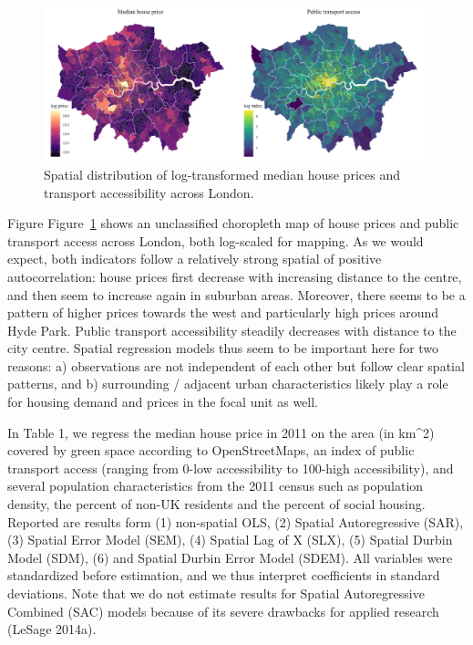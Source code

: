 \documentclass[
  letterpaper,
]{scrbook}
\begin{document}
\begin{figure}

{\centering \includegraphics{fig/Maps.jpeg}

}

\caption{\label{fig-map}Spatial distribution of log-transformed median
house prices and transport accessibility across London.}

\end{figure}

Figure Figure~\ref{fig-map} shows an unclassified choropleth map of
house prices and public transport access across London, both log-scaled
for mapping. As we would expect, both indicators follow a relatively
strong spatial of positive autocorrelation: house prices first decrease
with increasing distance to the centre, and then seem to increase again
in suburban areas. Moreover, there seems to be a pattern of higher
prices towards the west and particularly high prices around Hyde Park.
Public transport accessibility steadily decreases with distance to the
city centre. Spatial regression models thus seem to be important here
for two reasons: a) observations are not independent of each other but
follow clear spatial patterns, and b) surrounding / adjacent urban
characteristics likely play a role for housing demand and prices in the
focal unit as well.

In Table 1, we regress the median house price in 2011 on the area (in
km\^{}2) covered by green space according to OpenStreetMaps, an index of
public transport access (ranging from 0-low accessibility to 100-high
accessibility), and several population characteristics from the 2011
census such as population density, the percent of non-UK residents and
the percent of social housing. Reported are results form (1) non-spatial
OLS, (2) Spatial Autoregressive (SAR), (3) Spatial Error Model (SEM),
(4) Spatial Lag of X (SLX), (5) Spatial Durbin Model (SDM), (6) and
Spatial Durbin Error Model (SDEM). All variables were standardized
before estimation, and we thus interpret coefficients in standard
deviations. Note that we do not estimate results for Spatial
Autoregressive Combined (SAC) models because of its severe drawbacks for
applied research (LeSage 2014a).
\end{document}
